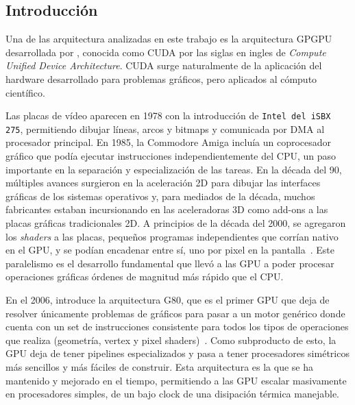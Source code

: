 \subsection{Introducci\'on}

Una de las arquitectura analizadas en este trabajo es la arquitectura GPGPU desarrollada por \nvidia{}, conocida como CUDA por las siglas en ingles de \textit{Compute Unified Device Architecture}.
CUDA surge naturalmente de la aplicaci\'on del hardware desarrollado para problemas gr\'aficos, pero aplicados al c\'omputo cient\'ifico.

Las placas de v\'ideo aparecen en 1978 con la introducci\'on de \texttt{Intel del iSBX 275}, permitiendo dibujar l\'ineas, arcos y bitmaps y comunicada por DMA al procesador principal. En 1985, la Commodore Amiga inclu\'ia un coprocesador gr\'afico que pod\'ia ejecutar instrucciones independientemente del CPU, un paso importante en la separaci\'on y especializaci\'on de las tareas.
En la d\'ecada del 90, m\'ultiples avances surgieron en la aceleraci\'on 2D para dibujar las interfaces gr\'aficas de los sistemas operativos y, para mediados de la d\'ecada, muchos fabricantes estaban incursionando en las aceleradoras 3D como add-ons a las placas gr\'aficas tradicionales 2D.
A principios de la d\'ecada del 2000, se agregaron los \textit{shaders} a las placas, peque\~nos programas independientes que corr\'ian nativo en el GPU, y se pod\'ian encadenar entre s\'i, uno por pixel en la pantalla~\cite{CG}.
Este paralelismo es el desarrollo fundamental que llev\'o a las GPU a poder procesar operaciones gr\'aficas \'ordenes de magnitud m\'as r\'apido que el CPU.

En el 2006, \nvidia{} introduce la arquitectura G80, que es el primer GPU que deja de resolver \'unicamente problemas de gr\'aficos para pasar a un motor gen\'erico donde cuenta con un set de instrucciones consistente para todos los tipos de operaciones que realiza (geometr\'ia, vertex y pixel shaders)~\cite{cudaHandbook}.
Como subproducto de esto, la GPU deja de tener pipelines especializados y pasa a tener procesadores sim\'etricos m\'as sencillos y m\'as f\'aciles de construir.
Esta arquitectura es la que se ha mantenido y mejorado en el tiempo, permitiendo a las GPU escalar masivamente en procesadores simples, de un bajo clock de una disipaci\'on t\'ermica
manejable.

